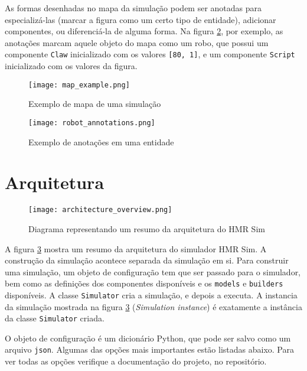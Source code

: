 As formas desenhadas no mapa da simulação podem ser anotadas para especializá-las (marcar a figura como um certo tipo de entidade), adicionar componentes, ou diferenciá-la de alguma forma. Na figura \ref{fig:example_annotations}, por exemplo, as anotações marcam aquele objeto do mapa como um robo, que possui um componente \texttt{Claw} inicializado com os valores \texttt{[80, 1]}, e um componente \texttt{Script} inicializado com os valores da figura.

\begin{figure}[ht]
    \centering
    \texttt{[image: map\_example.png]}
    \caption{Exemplo de mapa de uma simulação}
    \label{fig:example_map}
\end{figure}

\begin{figure}[ht]
    \centering
    \texttt{[image: robot\_annotations.png]}
    \caption{Exemplo de anotações em uma entidade}
    \label{fig:example_annotations}
\end{figure}


\section{Arquitetura}
\label{sec:architecture}

\begin{figure}[ht]
    \centering
    \texttt{[image: architecture\_overview.png]}
    \caption{Diagrama representando um resumo da arquitetura do HMR Sim}
    \label{fig:architecture_overview}
\end{figure}

A figura \ref{fig:architecture_overview} mostra um resumo da arquitetura do simulador HMR Sim. A construção da simulação acontece separada da simulação em si. Para construir uma simulação, um objeto de configuração tem que ser passado para o simulador, bem como as definições dos componentes disponíveis e os \texttt{models} e \texttt{builders} disponíveis. A classe \texttt{Simulator} cria a simulação, e depois a executa. A instancia da simulação mostrada na figura \ref{fig:architecture_overview} (\textit{Simulation instance}) é exatamente a instância da classe \texttt{Simulator} criada.

O objeto de configuração é um dicionário Python, que pode ser salvo como um arquivo \texttt{json}. Algumas das opções mais importantes estão listadas abaixo. Para ver todas as opções verifique a documentação do projeto, no repositório.


